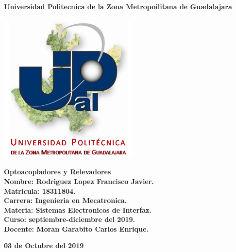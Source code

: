 \documentclass[12pt,a4paper]{article}
\author{Rodriguez Lopez Francisco Javier}
\begin{document}
\begin{center}
\LARGE \textbf{Universidad Politecnica de la Zona Metropoilitana de Guadalajara\\}


\includegraphics[width=7cm]{Upzmg.png} 

\LARGE \textbf{Optoacopladores y Relevadores}\\
\vspace{2cm}
\large \textbf{Nombre: Rodriguez Lopez Francisco Javier.\\
\vspace{0.5cm} Matricula: 18311804.\\
\vspace{0.5cm} Carrera: Ingenieria en Mecatronica.\\
\vspace{0.5cm} Materia: Sistemas Electronicos de Interfaz.\\
\vspace{0.5cm} Curso: septiembre-diciembre del 2019.\\
\vspace{0.5cm} Docente: Moran Garabito Carlos Enrique.}


\vspace{6cm}
\small \textbf{03 de Octubre del 2019}
\end{center}
\end{document}
